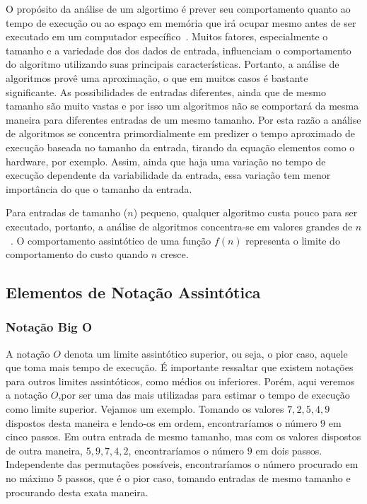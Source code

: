 \documentclass[11pt,fleqn]{book} %
\begin{document}
O propósito da análise de um algortimo é prever seu comportamento quanto ao tempo de execução ou ao espaço em memória que irá ocupar mesmo antes de ser executado em um computador específico~\cite{manber1989}.
Muitos fatores, especialmente o tamanho e a variedade dos dos dados de entrada, influenciam o comportamento do algoritmo utilizando suas principais características.
Portanto, a análise de algoritmos provê uma aproximação, o que em muitos casos é bastante significante.
As possibilidades de entradas diferentes, ainda que de mesmo tamanho são muito vastas e por isso um algoritmos não se comportará da mesma maneira para diferentes entradas de um mesmo tamanho. 
Por esta razão a análise de algoritmos se concentra primordialmente em predizer o tempo aproximado de execução baseada no tamanho da entrada, tirando da equação elementos como o hardware, por exemplo.
Assim, ainda que haja uma variação no tempo de execução dependente da variabilidade da entrada, essa variação tem menor importância do que o tamanho da entrada.

Para entradas de tamanho ($n$) pequeno, qualquer algoritmo custa pouco para ser executado, portanto, a análise de algoritmos concentra-se em valores grandes de $n$~\cite{ziviani2007}.
O comportamento assintótico de uma função $f(n)$ representa o limite do comportamento do custo quando $n$ cresce.

\subsection{Elementos de Notação Assintótica}

\subsubsection{Notação Big O}
A notação $O$ denota um limite assintótico superior, ou seja, o pior caso, aquele que toma mais tempo de execução.
É importante ressaltar que existem notações para outros limites assintóticos, como médios ou inferiores.
Porém, aqui veremos a notação $O$,por ser uma das mais utilizadas para estimar o tempo de execução como limite superior.
Vejamos um exemplo. 
Tomando os valores $7, 2, 5, 4, 9$ dispostos desta maneira e lendo-os em ordem, encontraríamos o número $9$ em cinco passos.
Em outra entrada de mesmo tamanho, mas com os valores dispostos de outra maneira, $5, 9, 7, 4, 2$, encontraríamos o número $9$ em dois passos.
Independente das permutações possíveis, encontraríamos o número procurado em no máximo 5 passos, que é o pior caso, tomando entradas de mesmo tamanho e procurando desta exata maneira.
\end{document}
